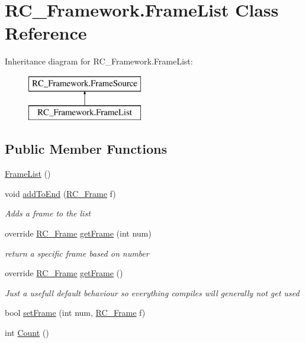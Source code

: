 \hypertarget{class_r_c___framework_1_1_frame_list}{}\section{R\+C\+\_\+\+Framework.\+Frame\+List Class Reference}
\label{class_r_c___framework_1_1_frame_list}
Inheritance diagram for R\+C\+\_\+\+Framework.\+Frame\+List\+:\begin{figure}[H]
\begin{center}
\leavevmode
\includegraphics[height=2.000000cm]{class_r_c___framework_1_1_frame_list}
\end{center}
\end{figure}
\subsection*{Public Member Functions}
\begin{DoxyCompactItemize}
\item 
\mbox{\hyperlink{class_r_c___framework_1_1_frame_list_a1c3c1a8575092c34e47a77fc90100d71}{Frame\+List}} ()
\item 
void \mbox{\hyperlink{class_r_c___framework_1_1_frame_list_a0143dca563006dc8f6c6256cc69a0da2}{add\+To\+End}} (\mbox{\hyperlink{class_r_c___framework_1_1_r_c___frame}{R\+C\+\_\+\+Frame}} f)
\begin{DoxyCompactList}\small\item\em Adds a frame to the list \end{DoxyCompactList}\item 
override \mbox{\hyperlink{class_r_c___framework_1_1_r_c___frame}{R\+C\+\_\+\+Frame}} \mbox{\hyperlink{class_r_c___framework_1_1_frame_list_a5bfd1878eccd7e9e0c66f6e848383e6b}{get\+Frame}} (int num)
\begin{DoxyCompactList}\small\item\em return a specific frame based on number \end{DoxyCompactList}\item 
override \mbox{\hyperlink{class_r_c___framework_1_1_r_c___frame}{R\+C\+\_\+\+Frame}} \mbox{\hyperlink{class_r_c___framework_1_1_frame_list_ab91faad4e97b6e118d1b49d267d15b34}{get\+Frame}} ()
\begin{DoxyCompactList}\small\item\em Just a usefull default behaviour so everything compiles will generally not get used \end{DoxyCompactList}\item 
bool \mbox{\hyperlink{class_r_c___framework_1_1_frame_list_a298e87d53528b497f85fdf61bf519972}{set\+Frame}} (int num, \mbox{\hyperlink{class_r_c___framework_1_1_r_c___frame}{R\+C\+\_\+\+Frame}} f)
\item 
int \mbox{\hyperlink{class_r_c___framework_1_1_frame_list_a305c5e5f7911a8f066d1cc9f355541c3}{Count}} ()
\end{DoxyCompactItemize}
